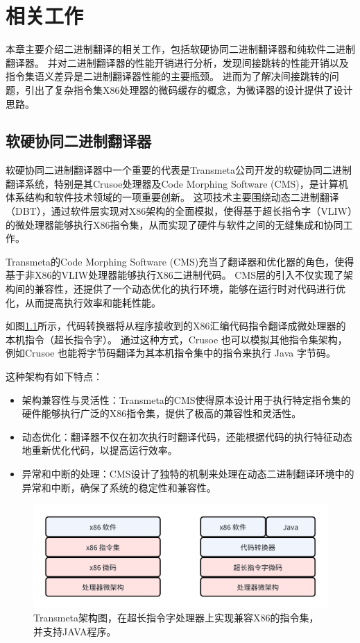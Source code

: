 \chapter{相关工作}\label{chap:related_work}

本章主要介绍二进制翻译的相关工作，包括软硬协同二进制翻译器和纯软件二进制翻译器。
并对二进制翻译器的性能开销进行分析，发现间接跳转的性能开销以及指令集语义差异是二进制翻译器性能的主要瓶颈。
进而为了解决间接跳转的问题，引出了复杂指令集X86处理器的微码缓存的概念，为微译器的设计提供了设计思路。

\section{软硬协同二进制翻译器}

软硬协同二进制翻译器中一个重要的代表是Transmeta公司开发的软硬协同二进制翻译系统，特别是其Crusoe处理器及Code Morphing Software (CMS)，是计算机体系结构和软件技术领域的一项重要创新。
这项技术主要围绕动态二进制翻译（DBT），通过软件层实现对X86架构的全面模拟，使得基于超长指令字（VLIW）的微处理器能够执行X86指令集，从而实现了硬件与软件之间的无缝集成和协同工作。

Transmeta的Code Morphing Software (CMS)充当了翻译器和优化器的角色，使得基于非X86的VLIW处理器能够执行X86二进制代码。
CMS层的引入不仅实现了架构间的兼容性，还提供了一个动态优化的执行环境，能够在运行时对代码进行优化，从而提高执行效率和能耗性能\cite{dehnertTransmetaCodeMorphing2003}。

如图\ref{img:transmeta_arch}所示，代码转换器将从程序接收到的X86汇编代码指令翻译成微处理器的本机指令（超长指令字）。
通过这种方式，Crusoe 也可以模拟其他指令集架构，例如Crusoe 也能将字节码翻译为其本机指令集中的指令来执行 Java 字节码。

这种架构有如下特点：
\begin{itemize}
\item 架构兼容性与灵活性：Transmeta的CMS使得原本设计用于执行特定指令集的硬件能够执行广泛的X86指令集，提供了极高的兼容性和灵活性。
\item 动态优化：翻译器不仅在初次执行时翻译代码，还能根据代码的执行特征动态地重新优化代码，以提高运行效率。
\item 异常和中断的处理：CMS设计了独特的机制来处理在动态二进制翻译环境中的异常和中断，确保了系统的稳定性和兼容性\cite{dehnertTransmetaCodeMorphing2003}。
\end{itemize}

\begin{figure}[h]
    \centering
    \includegraphics[width=0.8\linewidth]{./feishuImage/transmeta_arch.png}
    \caption{Transmeta架构图，在超长指令字处理器上实现兼容X86的指令集，并支持JAVA程序。}
    \label{img:transmeta_arch}
  \end{figure}


